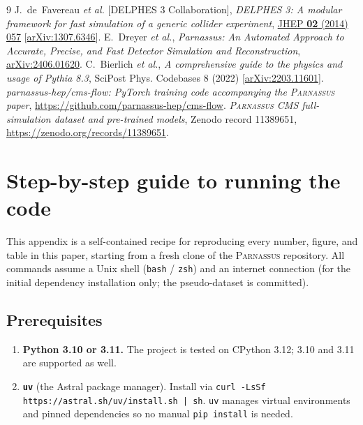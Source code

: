 \documentclass[a4paper,11pt]{article}
\begin{document}
\begin{thebibliography}{9}
J.~de~Favereau \emph{et al.} [DELPHES 3 Collaboration],
\textit{DELPHES 3: A modular framework for fast simulation of a
generic collider experiment},
\href{https://doi.org/10.1007/JHEP02(2014)057}{JHEP \textbf{02} (2014) 057}
[\href{https://arxiv.org/abs/1307.6346}{arXiv:1307.6346}].
E.~Dreyer \emph{et al.},
\textit{Parnassus: An Automated Approach to Accurate, Precise, and
Fast Detector Simulation and Reconstruction},
\href{https://arxiv.org/abs/2406.01620}{arXiv:2406.01620}.
C.~Bierlich \emph{et al.},
\textit{A comprehensive guide to the physics and usage of Pythia 8.3},
SciPost Phys. Codebases 8 (2022)
[\href{https://arxiv.org/abs/2203.11601}{arXiv:2203.11601}].
\textit{parnassus-hep/cms-flow: PyTorch training code accompanying
the \textsc{Parnassus} paper},
\url{https://github.com/parnassus-hep/cms-flow}.
\textit{\textsc{Parnassus} CMS full-simulation dataset and pre-trained
models}, Zenodo record 11389651,
\url{https://zenodo.org/records/11389651}.
\end{thebibliography}

\appendix

\section{Step-by-step guide to running the code}
\label{app:howto}

This appendix is a self-contained recipe for reproducing every
number, figure, and table in this paper, starting from a fresh clone
of the \textsc{Parnassus} repository. All commands assume a Unix
shell (\texttt{bash} / \texttt{zsh}) and an internet connection
(for the initial dependency installation only; the pseudo-dataset is
committed).

\subsection{Prerequisites}

\begin{enumerate}
\item \textbf{Python 3.10 or 3.11.} The project is tested on CPython
      3.12; 3.10 and 3.11 are supported as well.
\item \textbf{\texttt{uv}} (the Astral package manager). Install
      via \texttt{curl -LsSf https://astral.sh/uv/install.sh | sh}.
      \texttt{uv} manages virtual environments and pinned
      dependencies so no manual \texttt{pip install} is needed.
\end{enumerate}
\end{document}
